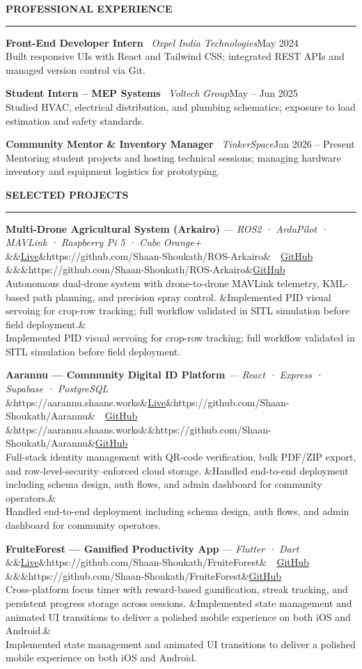 \documentclass[10.8pt, a4paper]{article}
\newcommand{\cvsection}[1]{%
  \vspace{7pt}%
  {\color{accent}\textbf{\MakeUppercase{#1}}}\\[-5pt]
  {\color{rulecol}\rule{\linewidth}{0.5pt}}%
  \vspace{2pt}%
}
\newcommand{\entry}[4]{%
  \textbf{#1} \textbar\ \textit{#2}\hfill{\small\color{subtle}#3}\\
  {\small #4}%
}
\newcommand{\project}[6]{%
  \textbf{#1} {\small\color{subtle}\textit{— #2}}%
  \ifx&#6&\else\hfill{\small\href{#6}{\textcolor{accent}{Live}}\ifx&#5&\else\ \textbar\ \href{#5}{\textcolor{accent}{GitHub}}\fi}\fi%
  \ifx&#6&\ifx&#5&\else\hfill{\small\href{#5}{\textcolor{accent}{GitHub}}}\fi\fi\\
  {\small #3}%
  \ifx&#4&\else\\ {\small #4}\fi%
}
\begin{document}
\cvsection{Professional Experience}

\entry{Front-End Developer Intern}{Oxpel India Technologies}{May 2024}%
      {Built responsive UIs with React and Tailwind CSS; integrated REST APIs and managed version control via Git.}

\vspace{4pt}
\entry{Student Intern – MEP Systems}{Voltech Group}{May – Jun 2025}%
      {Studied HVAC, electrical distribution, and plumbing schematics; exposure to load estimation and safety standards.}

\vspace{4pt}
\entry{Community Mentor \& Inventory Manager}{TinkerSpace}{Jan 2026 – Present}%
      {Mentoring student projects and hosting technical sessions; managing hardware inventory and equipment logistics for prototyping.}

\cvsection{Selected Projects}

\project{Multi-Drone Agricultural System (Arkairo)}{ROS2 · ArduPilot · MAVLink · Raspberry Pi 5 · Cube Orange+}%
        {Autonomous dual-drone system with drone-to-drone MAVLink telemetry, KML-based path planning, and precision spray control.}%
        {Implemented PID visual servoing for crop-row tracking; full workflow validated in SITL simulation before field deployment.}%
        {https://github.com/Shaan-Shoukath/ROS-Arkairo}{}

\vspace{4pt}
\project{Aarannu — Community Digital ID Platform}{React · Express · Supabase · PostgreSQL}%
        {Full-stack identity management with QR-code verification, bulk PDF/ZIP export, and row-level-security–enforced cloud storage.}%
        {Handled end-to-end deployment including schema design, auth flows, and admin dashboard for community operators.}%
        {https://github.com/Shaan-Shoukath/Aarannu}{https://aarannu.shaans.works}

\vspace{4pt}
\project{FruiteForest — Gamified Productivity App}{Flutter · Dart}%
        {Cross-platform focus timer with reward-based gamification, streak tracking, and persistent progress storage across sessions.}%
        {Implemented state management and animated UI transitions to deliver a polished mobile experience on both iOS and Android.}%
        {https://github.com/Shaan-Shoukath/FruiteForest}{}
\end{document}
